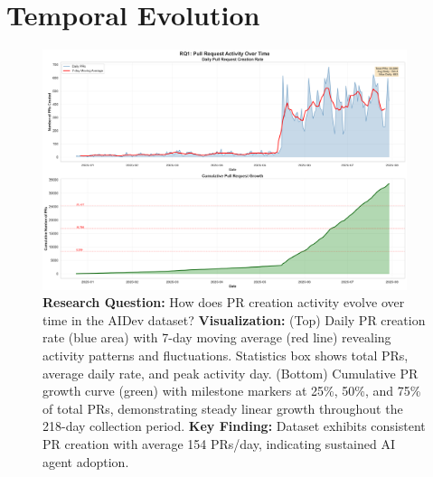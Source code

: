 \documentclass[11pt]{article}
\begin{document}
\section{Temporal Evolution}

\begin{figure}[H]
\centering
\includegraphics[width=0.95\textwidth]{figures/temporal_01_pr_growth.png}
\caption{\textbf{Research Question:} How does PR creation activity evolve over time in the AIDev dataset? \textbf{Visualization:} (Top) Daily PR creation rate (blue area) with 7-day moving average (red line) revealing activity patterns and fluctuations. Statistics box shows total PRs, average daily rate, and peak activity day. (Bottom) Cumulative PR growth curve (green) with milestone markers at 25\%, 50\%, and 75\% of total PRs, demonstrating steady linear growth throughout the 218-day collection period. \textbf{Key Finding:} Dataset exhibits consistent PR creation with average 154 PRs/day, indicating sustained AI agent adoption.}
\label{fig:temporal_pr}
\end{figure}
\end{document}
